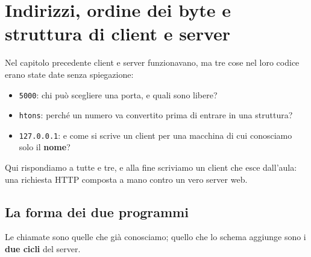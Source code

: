 \chapter{Indirizzi, ordine dei byte e struttura di client e server}

Nel capitolo precedente client e server funzionavano, ma tre cose nel loro codice erano state date senza spiegazione:
\begin{itemize}
    \item \texttt{5000}: chi può scegliere una porta, e quali sono libere?
    \item \texttt{htons}: perché un numero va convertito prima di entrare in una struttura?
    \item \texttt{127.0.0.1}: e come si scrive un client per una macchina di cui conosciamo solo il \textbf{nome}?
\end{itemize}
Qui rispondiamo a tutte e tre, e alla fine scriviamo un client che esce dall'aula: una richiesta HTTP composta a mano
contro un vero server web.

\section{La forma dei due programmi}

Le chiamate sono quelle che già conosciamo; quello che lo schema aggiunge sono i \textbf{due cicli} del server.

